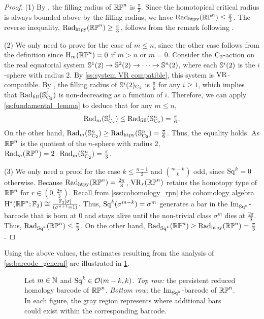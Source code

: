 \begin{proof}
	(1) By \cite{katz1983filling}, the filling radius of $\mathbb{RP}^n$ is $\frac{\pi}{3}$.
	Since the homotopical critical radius is always bounded above by the filling radius, we have $\mathrm{Rad}_{\mathrm{htpy}}(\mathbb{RP}^n) \leq \frac{\pi}{3}$.
	The reverse inequality, $\mathrm{Rad}_{\mathrm{htpy}}(\mathbb{RP}^n) \geq \frac{\pi}{3}$, follows from the remark following \cite[Thm.~4.5]{adams2022metric}.

	\smallskip (2) We only need to prove for the case of $m\leq n$, since the other case follows from the definition since \(\mathrm{H}_m(\mathbb{RP}^n) = 0\) if \(m > n\) or \(m = 0\).
	Consider the \(\mathrm{C}_2\)-action on the real equatorial system \(\mathbb{S}^{1}(2) \to \mathbb{S}^{2}(2) \to \dotsb \to \mathbb{S}^{n}(2)\), where each $\mathbb{S}^{i}(2)$ is the $i$-sphere with radius $2$.
	By \cref{ss:system VR compatible}, this system is \(\mathrm{VR}\)-compatible.
	By \cite{katz1983filling}, the filling radius of $\mathbb{S}^{i}(2)_{\mathrm{C}_2}$ is $\frac{\pi}{6}$ for any $i \geq 1$, which implies that $\mathrm{Rad}_{\mathrm{fill}}(\mathbb{S}^{i}_{\mathrm{C}_2})$ is non-decreasing as a function of \(i\).
	Therefore, we can apply \cref{ss:fundamental_lemma} to deduce that for any \(m \leq n\),
	\[
	\mathrm{Rad}_{m}(\mathbb{S}^{1}_{\mathrm{C}_2}) \leq \mathrm{Rad}_{\mathrm{fill}}(\mathbb{S}^{n}_{\mathrm{C}_2}) = \tfrac{\pi}{6}.
	\]
	On the other hand, $\mathrm{Rad}_{m}(\mathbb{S}^{n}_{\mathrm{C}_2})\geq \mathrm{Rad}_{\mathrm{htpy}}(\mathbb{S}^{n}_{\mathrm{C}_2}) = \tfrac{\pi}{6}$.
	Thus, the equality holds.
	As $\mathbb{RP}^n$ is the quotient of the $n$-sphere with radius $2$, $\mathrm{Rad}_{m}(\mathbb{RP}^n) = 2\cdot \mathrm{Rad}_{m}(\mathbb{S}^{n}_{\mathrm{C}_2}) = \frac{\pi}{3}$.

	\smallskip (3) We only need a proof for the case $k \leq \frac{n-1}{2}$ and $\binom{m-k}{k}$ odd, since \(\mathrm{Sq}^k = 0\) otherwise.
	Because $\mathrm{Rad}_{\mathrm{htpy}}(\mathbb{RP}^n)=\frac{2\pi}{3}$, $\mathrm{VR}_r(\mathbb{RP}^n)$ retains the homotopy type of $\mathbb{RP}^n$ for $r \in (0,\tfrac{2\pi}{3})$.
	Recall from \cref{sss:cohomology_rpn} the cohomology algebra \(\mathrm{H}^\ast(\mathbb{RP}^n; {\mathbb{F}_2}) \cong \frac{{\mathbb{F}_2}[\sigma]}{(\sigma^{n+1} = 1)}.\)
	Thus, $\mathrm{Sq}^k(\sigma^{m-k}) = \sigma^{m}$ generates a bar in the $\operatorname{Im}_{\mathrm{Sq}^k}$-barcode that is born at $0$ and stays alive until the non-trivial class $\sigma^{m}$ dies at $\tfrac{2\pi}{3}$.
	Thus, $\mathrm{Rad}_{\mathrm{Sq}^k}(\mathbb{RP}^n) \leq \tfrac{\pi}{3}$.
	On the other hand, $\mathrm{Rad}_{\mathrm{Sq}^k}(\mathbb{RP}^n) \geq \mathrm{Rad}_{\mathrm{htpy}}(\mathbb{RP}^n) = \tfrac{\pi}{3}$.
\end{proof}

Using the above values, the estimates resulting from the analysis of \cref{ss:barcode_general} are illustrated in \cref{fig:sq barcodes}.

\begin{figure}
	\centering
	
	\caption{Let $m \in \mathbb{N}$ and $\mathrm{Sq}^k \in \mathcal{O}(m-k, k)$.
		\emph{Top row:} the persistent reduced homology barcode of $\mathbb{RP}^n$.
		\emph{Bottom row:} the $\operatorname{Im}_{\mathrm{Sq}^k}$-barcode of $\mathbb{RP}^n$.
		In each figure, the gray region represents where additional bars could exist within the corresponding barcode.}
	\label{fig:sq barcodes}
\end{figure}

